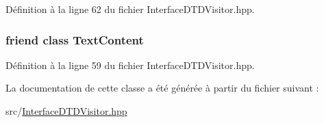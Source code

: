 Définition à la ligne 62 du fichier InterfaceDTDVisitor.hpp.

\hypertarget{classdtd_1_1_interface_d_t_d_visitor_aa641efa971cba38c6181cdc71b30df90}{
\subsubsection[{TextContent}]{\setlength{\rightskip}{0pt plus 5cm}friend class {\bf TextContent}}}
\label{classdtd_1_1_interface_d_t_d_visitor_aa641efa971cba38c6181cdc71b30df90}


Définition à la ligne 59 du fichier InterfaceDTDVisitor.hpp.



La documentation de cette classe a été générée à partir du fichier suivant :\begin{DoxyCompactItemize}
\item 
src/\hyperlink{_interface_d_t_d_visitor_8hpp}{InterfaceDTDVisitor.hpp}\end{DoxyCompactItemize}
